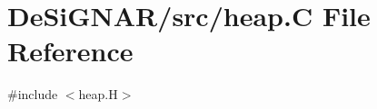 \hypertarget{heap_8_c}{}\section{De\+Si\+G\+N\+A\+R/src/heap.C File Reference}
\label{heap_8_c}
{\ttfamily \#include $<$heap.\+H$>$}\newline
